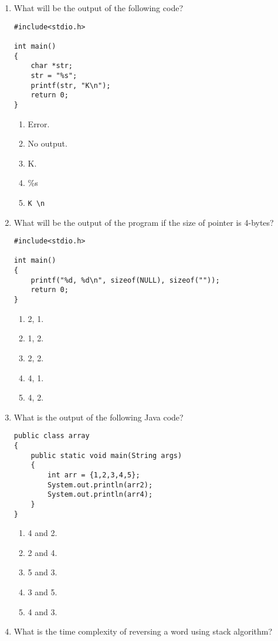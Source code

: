 \documentclass{article}
\begin{document}
\begin{enumerate}
    
\item What will be the output of the following code?

            \begin{verbatim}
#include<stdio.h>

int main()
{
    char *str;
    str = "%s";
    printf(str, "K\n");
    return 0;
}
            \end{verbatim}
    
            \begin{enumerate}
                \item Error.
                \item No output.
                \item K.
                \item \%s
                \item \begin{verbatim}K \n \end{verbatim}
            \end{enumerate}
\item What will be the output of the program if the size of pointer is 4-bytes?

            \begin{verbatim}
#include<stdio.h>

int main()
{
    printf("%d, %d\n", sizeof(NULL), sizeof(""));
    return 0;
}
            \end{verbatim}
    
            \begin{enumerate}
                \item 2, 1.
                \item 1, 2.
                \item 2, 2.
                \item 4, 1.
                \item 4, 2.
            \end{enumerate}
\item What is the output of the following Java code?

            \begin{verbatim}
public class array
{
	public static void main(String args)
	{
		int arr = {1,2,3,4,5};
		System.out.println(arr2);
		System.out.println(arr4);
	}
}
            \end{verbatim}
    
            \begin{enumerate}
                \item 4 and 2.
                \item 2 and 4.
                \item 5 and 3.
                \item 3 and 5.
                \item 4 and 3.
            \end{enumerate}
\item What is the time complexity of reversing a word using stack algorithm?


\end{enumerate}
\end{document}

